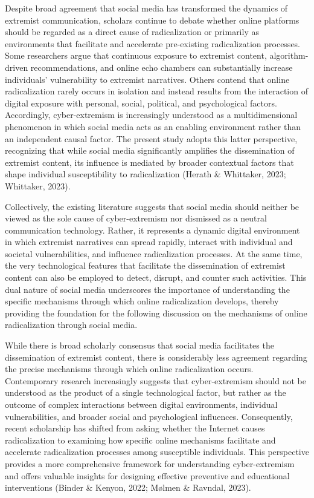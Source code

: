 \documentclass[10pt]{NSP1}
\begin{document}
Despite broad agreement that social media has transformed the dynamics of extremist communication, scholars continue to debate whether online platforms should be regarded as a direct cause of radicalization or primarily as environments that facilitate and accelerate pre-existing radicalization processes. Some researchers argue that continuous exposure to extremist content, algorithm-driven recommendations, and online echo chambers can substantially increase individuals' vulnerability to extremist narratives. Others contend that online radicalization rarely occurs in isolation and instead results from the interaction of digital exposure with personal, social, political, and psychological factors. Accordingly, cyber-extremism is increasingly understood as a multidimensional phenomenon in which social media acts as an enabling environment rather than an independent causal factor. The present study adopts this latter perspective, recognizing that while social media significantly amplifies the dissemination of extremist content, its influence is mediated by broader contextual factors that shape individual susceptibility to radicalization (Herath \& Whittaker, 2023; Whittaker, 2023).

Collectively, the existing literature suggests that social media should neither be viewed as the sole cause of cyber-extremism nor dismissed as a neutral communication technology. Rather, it represents a dynamic digital environment in which extremist narratives can spread rapidly, interact with individual and societal vulnerabilities, and influence radicalization processes. At the same time, the very technological features that facilitate the dissemination of extremist content can also be employed to detect, disrupt, and counter such activities. This dual nature of social media underscores the importance of understanding the specific mechanisms through which online radicalization develops, thereby providing the foundation for the following discussion on the mechanisms of online radicalization through social media.

\par\medskip{}\smallskip

While there is broad scholarly consensus that social media facilitates the dissemination of extremist content, there is considerably less agreement regarding the precise mechanisms through which online radicalization occurs. Contemporary research increasingly suggests that cyber-extremism should not be understood as the product of a single technological factor, but rather as the outcome of complex interactions between digital environments, individual vulnerabilities, and broader social and psychological influences. Consequently, recent scholarship has shifted from asking whether the Internet causes radicalization to examining how specific online mechanisms facilitate and accelerate radicalization processes among susceptible individuals. This perspective provides a more comprehensive framework for understanding cyber-extremism and offers valuable insights for designing effective preventive and educational interventions (Binder \& Kenyon, 2022; Mølmen \& Ravndal, 2023).
\end{document}
